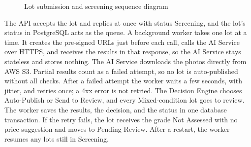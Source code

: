 \begin{figure}[H]
\caption{Lot submission and screening sequence diagram}
\label{fig:sd-01}
\end{figure}

The API accepts the lot and replies at once with status Screening, and the lot's
status in PostgreSQL acts as the queue. A background worker takes one lot at a time.
It creates the pre-signed URLs just before each call, calls the AI Service over
HTTPS, and receives the results in that response, so the AI Service stays stateless
and stores nothing. The AI Service downloads the photos directly from AWS S3. Partial
results count as a failed attempt, so no lot is auto-published without all checks.
After a failed attempt the worker waits a few seconds, with jitter, and retries once;
a 4xx error is not retried. The Decision Engine chooses Auto-Publish or Send to Review,
and every Mixed-condition lot goes to review. The worker saves the results, the
decision, and the status in one database transaction. If the retry fails, the lot
receives the grade Not Assessed with no price suggestion and moves to Pending Review.
After a restart, the worker resumes any lots still in Screening.

